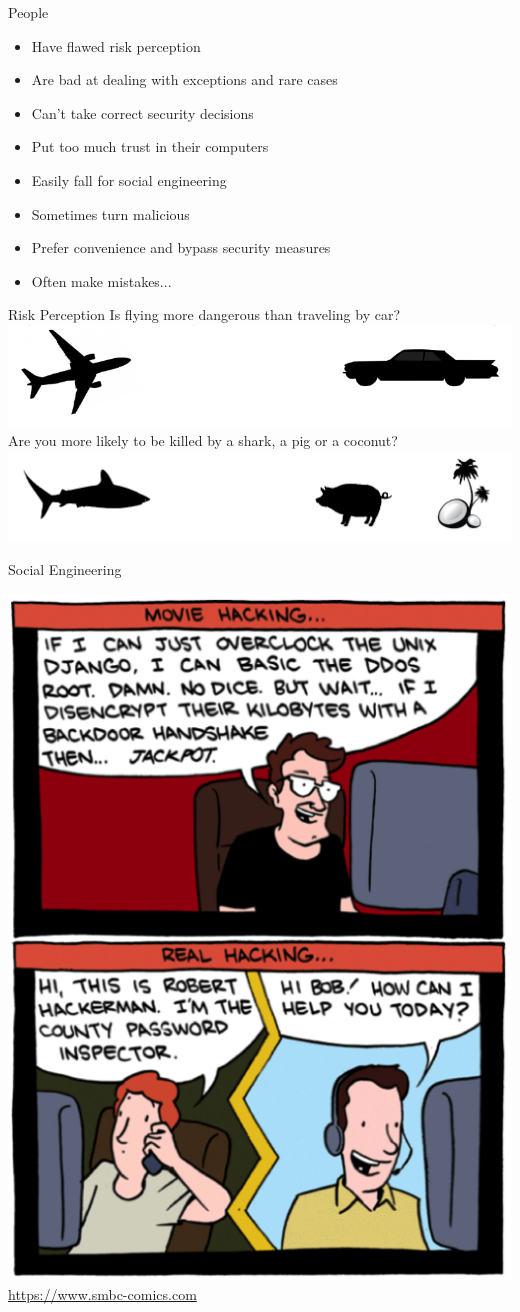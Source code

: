 \documentclass{beamer}
\begin{document}
\begin{frame}{People}
	\begin{itemize}
		\item Have flawed risk perception
		\item Are bad at dealing with exceptions and rare cases
        \item Can't take correct security decisions
        \item Put too much trust in their computers
        \item Easily fall for social engineering
        \item Sometimes turn malicious
        \item Prefer convenience and bypass security measures
        \item Often make mistakes...
	\end{itemize}
\end{frame}

\begin{frame}{Risk Perception}
Is flying more dangerous than traveling by car?
\newline
\includegraphics[width=0.8\linewidth]{planecar.png}
\newline 
Are you more likely to be killed by a shark, a pig or a coconut?
\newline
\includegraphics[width=0.8\linewidth]{sharkpigcoco.png}
\end{frame}

\begin{frame}{Social Engineering}
\begin{center}
\includegraphics[width=0.4\linewidth]{socialengineering.png}\newline
{\small \url{https://www.smbc-comics.com}}
\end{center}
\end{frame}
\end{document}
